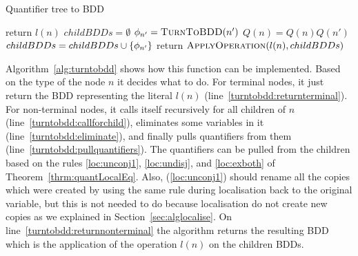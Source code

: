 \documentclass[
  digital, %
  color,
  twoside, %
  table,   %
  nolof,     %
  nolot,     %
]{fithesis3}
\let\setbuilder\set
\newcommand{\simpleset}[1]{\{{#1}\}}
\renewcommand{\set}[1]{\normalexpandarg\IfSubStr{#1}{|}{\setbuilder{#1}}{\simpleset{#1}}}
\theoremstyle{definition}
\theoremstyle{remark}
\newcommand{\qtlabel}[1]{l({#1})}
\newcommand{\prefix}[1]{Q({#1})}
\newcommand{\children}[1]{children({#1})}
\begin{document}
\begin{algorithm}
  \caption{Quantifier tree to BDD}
  \label{alg:turntobdd}
  \begin{algorithmic}[1]
      \If{$\qtlabel{n}$ is a literal}
        \State return $\qtlabel{n}$ \label{turntobdd:returnterminal}
      \Else
        \State $childBDDs = \emptyset$
        \ForAll{$n' \in \children{n}$}
          \State $\phi_{n'} = \Call{TurnToBDD}{n'}$ \label{turntobdd:callforchild}
          \State {} \label{turntobdd:eliminate}
          \State $\prefix{n} = \prefix{n}\prefix{n'}$ \label{turntobdd:pullquantifiers}
          \State $childBDDs = childBDDs \cup \set{\phi_{n'}}$ %
        \EndFor
        \State return $\Call{ApplyOperation}{\qtlabel{n}, childBDDs}$ \label{turntobdd:returnnonterminal}
      \EndIf
    \EndFunction
  \end{algorithmic}
\end{algorithm}

Algorithm~\ref{alg:turntobdd} shows how this function can be implemented. Based on the type of the node $n$ it decides what to do. For terminal nodes, it just return the BDD representing the literal $\qtlabel{n}$ (line~\ref{turntobdd:returnterminal}). For non-terminal nodes, it calls itself recursively for all children of $n$ (line~\ref{turntobdd:callforchild}), eliminates some variables in it (line~\ref{turntobdd:eliminate}), and finally pulls quantifiers from them (line~\ref{turntobdd:pullquantifiers}). The quantifiers can be pulled from the children based on the rules \eqref{loc:unconj1}, \eqref{loc:undisj}, and \eqref{loc:exboth} of Theorem~\ref{thrm:quantLocalEq}. Also, (\ref{loc:unconj1}) should rename all the copies which were created by using the same rule during localisation back to the original variable, but this is not needed to do because localisation do not create new copies as we explained in Section~\ref{sec:alglocalise}. On line~\ref{turntobdd:returnnonterminal} the algorithm returns the resulting BDD which is the application of the operation $\qtlabel{n}$ on the children BDDs.
\end{document}
